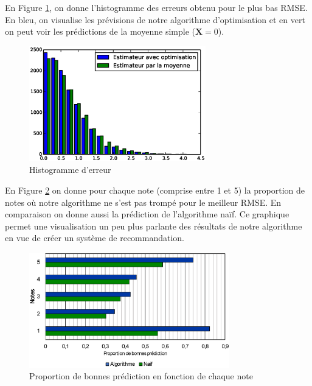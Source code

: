\documentclass[10pt,a4paper]{article}
\begin{document}
En Figure \ref{histo_best}, on donne l'histogramme des erreurs obtenu pour le plus bas RMSE. En bleu, on visualise les prévisions de notre algorithme d'optimisation et en vert on peut voir les prédictions de la moyenne simple ($\textbf{X}=0$). 




\begin{figure}[ht!]
\begin{center}
\includegraphics[height=5cm]{fig/hist.eps}
\caption{\label{histo_best} Histogramme d'erreur}
\end{center}
\end{figure}


En Figure \ref{graph_best} on donne pour chaque note (comprise entre 1 et 5) la proportion de notes où notre algorithme ne s'est pas trompé pour le meilleur RMSE. En comparaison on donne aussi la prédiction de l'algorithme naïf. Ce graphique permet une visualisation un peu plus parlante des résultats de notre algorithme en vue de créer un système de recommandation. 

\begin{figure}[ht!]
\begin{center}
\includegraphics[height=5cm]{fig/graph_best.eps}
\caption{\label{graph_best} Proportion de bonnes prédiction en fonction de chaque note}
\end{center}
\end{figure}
\end{document}
